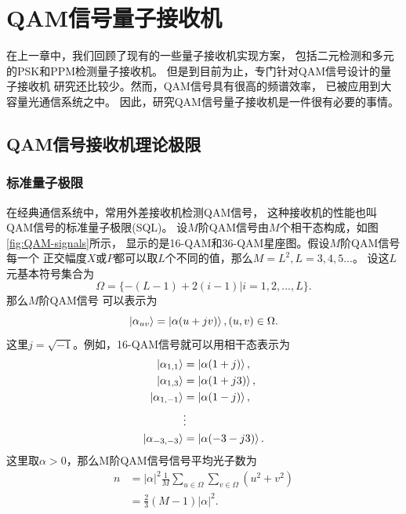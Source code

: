 \chapter{QAM信号量子接收机}
在上一章中，我们回顾了现有的一些量子接收机实现方案，
包括二元检测和多元的PSK和PPM检测量子接收机。
但是到目前为止，专门针对QAM信号设计的量子接收机
研究还比较少。然而，QAM信号具有很高的频谱效率，
已被应用到大容量光通信系统之中\cite{winzer2012high}。
因此，研究QAM信号量子接收机是一件很有必要的事情。

\section{QAM信号接收机理论极限}
\subsection{标准量子极限}
在经典通信系统中，常用外差接收机检测QAM信号，
这种接收机的性能也叫QAM信号的标准量子极限(SQL)\cite{kato1999quantum}。
设$M$阶QAM信号由$M$个相干态构成，如图\ref{fig:QAM-signals}所示，
显示的是16-QAM和36-QAM星座图。假设$M$阶QAM信号每一个
正交幅度$X$或$P$都可以取$L$个不同的值，那么$M=L^2, L=3,4,5...$。
设这$L$元基本符号集合为
\begin{equation}
\Omega = \{-(L-1) + 2(i-1) | i=1,2,...,L\}.
\label{eq:QAM-omega}
\end{equation}
那么$M$阶QAM信号
可以表示为
\begin{equation}
\ket{\alpha_{uv}} = \ket{\alpha(u + j v)}, (u, v) \in \Omega. 
\end{equation}
这里$j=\sqrt{-1}$。例如，16-QAM信号就可以用相干态表示为
\begin{equation}
\begin{split}
\ket{\alpha_{1,1}} &= \ket{\alpha(1 + j )}, \\
\ket{\alpha_{1,3}} &= \ket{\alpha(1 + j 3)}, \\
\ket{\alpha_{1,-1}} &= \ket{\alpha(1 - j )}, \\
                &\vdots                      \\
\ket{\alpha_{-3,-3}} &= \ket{\alpha(-3 - j 3)}.
\end{split}
\end{equation}
这里取$\alpha > 0$，那么M阶QAM信号信号平均光子数为
\begin{equation}
\begin{split}
n &= |\alpha|^2 \frac{1}{M}\sum_{u \in \Omega}\sum_{v \in \Omega} (u^2+v^2)\\
  &= \frac{2}{3}(M-1) |\alpha|^2.
\end{split}
\end{equation}


